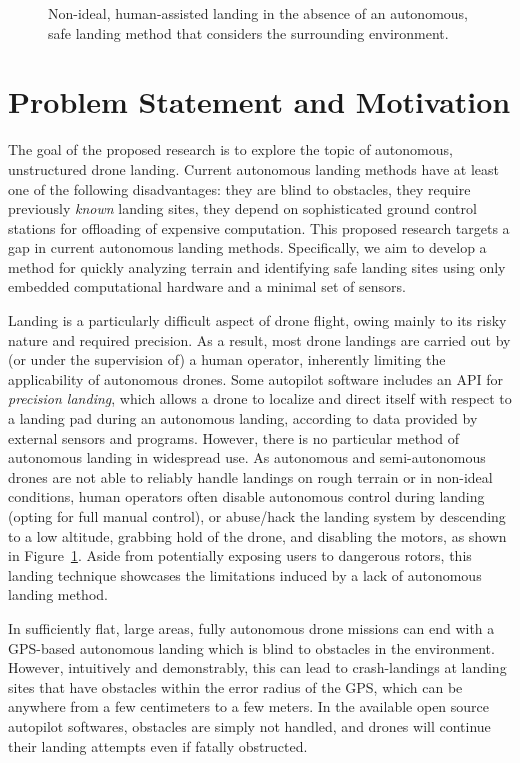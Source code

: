 \begin{figure}[ht]
    \centering
    \begin{minipage}{\wd0}
      \caption{Non-ideal, human-assisted landing in the absence of an autonomous, safe landing method that considers the surrounding environment.}
      \label{figure:hand_landing}
    \end{minipage}
\end{figure}

\section{Problem Statement and Motivation}

The goal of the proposed research is to explore the topic of
autonomous, unstructured drone landing.
Current autonomous landing methods have at least one of the following disadvantages:
they are blind to obstacles,
they require previously \textit{known} landing sites,
they depend on sophisticated ground control stations for offloading of expensive computation.
This proposed research targets a gap in current autonomous landing methods.
Specifically, we aim to develop a method for quickly analyzing terrain
and identifying safe landing sites using only embedded computational hardware
and a minimal set of sensors.

Landing is a particularly difficult aspect of drone flight,
owing mainly to its risky nature and required precision.
As a result, most drone landings are carried out by
(or under the supervision of)
a human operator,
inherently limiting the applicability of autonomous drones.
Some autopilot software includes an \gls{API} for \textit{precision landing},
which allows a drone to localize and direct itself with respect to a landing pad during an autonomous landing,
according to data provided by external sensors and programs.
However, there is no particular method of autonomous landing in widespread use.
As autonomous and semi-autonomous drones are not able to reliably handle landings
on rough terrain or in non-ideal conditions, human operators often disable
autonomous control during landing (opting for full manual control),
or abuse/hack the landing system by descending to a low altitude,
grabbing hold of the drone,
and disabling the motors,
as shown in Figure~\ref{figure:hand_landing}.
Aside from potentially exposing users to dangerous rotors,
this landing technique showcases the limitations induced by a lack of
autonomous landing method.

In sufficiently flat, large areas, fully autonomous drone missions can end with a GPS-based
autonomous landing which is blind to obstacles in the environment.
However,
intuitively and demonstrably,
this can lead to crash-landings at landing sites that have obstacles within
the error radius of the GPS,
which can be anywhere from a few centimeters to a few meters.
In the available open source autopilot softwares,
obstacles are simply not handled,
and drones will continue their landing attempts even if fatally obstructed.